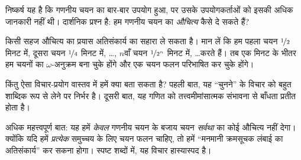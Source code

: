 \documentclass[../../../include/open-logic-section]{subfiles}
\begin{document}
निष्कर्ष यह है कि गणनीय चयन का बार-बार उपयोग हुआ, पर उसके उपयोगकर्ताओं को
इसकी अधिक जानकारी नहीं थी। दार्शनिक प्रश्न है: हम गणनीय चयन का
\emph{औचित्य} कैसे दे सकते हैं?

किसी सहज औचित्य का प्रयास अतिसंकार्य का सहारा ले सकता है। मान लें कि हम
पहला चयन $\nicefrac{1}{2}$ मिनट में, दूसरा चयन $\nicefrac{1}{4}$ मिनट में,
\dots, $n$वाँ चयन $\nicefrac{1}{2^n}$ मिनट में, \dots करते हैं। तब एक मिनट
के भीतर हम चयनों का $\omega$-अनुक्रम बना चुके होंगे और एक चयन फलन परिभाषित
कर चुके होंगे।

किंतु ऐसा विचार-प्रयोग वास्तव में हमें क्या बता सकता है? पहली बात, यह
``चुनने'' के विचार को बहुत शाब्दिक रूप से लेने पर निर्भर है। दूसरी बात, यह
गणित को तत्त्वमीमांसात्मक संभावना से बाँधता प्रतीत होता है।

अधिक महत्त्वपूर्ण बात: यह हमें \emph{केवल} गणनीय चयन के बजाय चयन
\emph{सर्वथा} का कोई औचित्य नहीं देगा। क्योंकि यदि हमें \emph{प्रत्येक}
समुच्चय के लिए चयन फलन चाहिए, तो हमें ``मनमानी क्रमसूचक लंबाई का अतिसंकार्य''
कर सकना होगा। स्पष्ट शब्दों में, यह विचार हास्यास्पद है।
\end{document}

